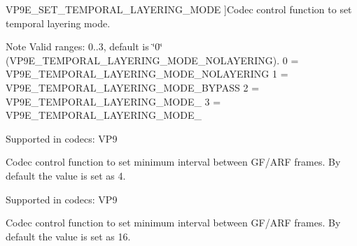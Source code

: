 \begin{Desc}
\begin{description}
{V\+P9\+E\+\_\+\+S\+E\+T\+\_\+\+T\+E\+M\+P\+O\+R\+A\+L\+\_\+\+L\+A\+Y\+E\+R\+I\+N\+G\+\_\+\+M\+O\+DE\hypertarget{group__vp8__encoder_gga6deae3d561c838952552c3d3756322eca34af61e36500e1455aa2fc5bf62183ea}{}\label{group__vp8__encoder_gga6deae3d561c838952552c3d3756322eca34af61e36500e1455aa2fc5bf62183ea}
}]Codec control function to set temporal layering mode. \begin{DoxyNote}{Note}
Valid ranges\+: 0..3, default is \char`\"{}0\char`\"{} (V\+P9\+E\+\_\+\+T\+E\+M\+P\+O\+R\+A\+L\+\_\+\+L\+A\+Y\+E\+R\+I\+N\+G\+\_\+\+M\+O\+D\+E\+\_\+\+N\+O\+L\+A\+Y\+E\+R\+I\+NG). 0 = V\+P9\+E\+\_\+\+T\+E\+M\+P\+O\+R\+A\+L\+\_\+\+L\+A\+Y\+E\+R\+I\+N\+G\+\_\+\+M\+O\+D\+E\+\_\+\+N\+O\+L\+A\+Y\+E\+R\+I\+NG 1 = V\+P9\+E\+\_\+\+T\+E\+M\+P\+O\+R\+A\+L\+\_\+\+L\+A\+Y\+E\+R\+I\+N\+G\+\_\+\+M\+O\+D\+E\+\_\+\+B\+Y\+P\+A\+SS 2 = V\+P9\+E\+\_\+\+T\+E\+M\+P\+O\+R\+A\+L\+\_\+\+L\+A\+Y\+E\+R\+I\+N\+G\+\_\+\+M\+O\+D\+E\+\_ 3 = V\+P9\+E\+\_\+\+T\+E\+M\+P\+O\+R\+A\+L\+\_\+\+L\+A\+Y\+E\+R\+I\+N\+G\+\_\+\+M\+O\+D\+E\+\_
\end{DoxyNote}
Supported in codecs\+: V\+P9 \item[{\em 
V\+P9\+E\+\_\+\+S\+E\+T\+\_\+\+M\+I\+N\+\_\+\+G\+F\+\_\+\+I\+N\+T\+E\+R\+V\+AL\hypertarget{group__vp8__encoder_gga6deae3d561c838952552c3d3756322eca04ae4a1b699c5d22f2510c7509124ea9}{}\label{group__vp8__encoder_gga6deae3d561c838952552c3d3756322eca04ae4a1b699c5d22f2510c7509124ea9}
}]Codec control function to set minimum interval between G\+F/\+A\+RF frames. By default the value is set as 4.

Supported in codecs\+: V\+P9 \item[{\em 
V\+P9\+E\+\_\+\+S\+E\+T\+\_\+\+M\+A\+X\+\_\+\+G\+F\+\_\+\+I\+N\+T\+E\+R\+V\+AL\hypertarget{group__vp8__encoder_gga6deae3d561c838952552c3d3756322ecae8a09d2ee42538af1c00bc403c6d29d8}{}\label{group__vp8__encoder_gga6deae3d561c838952552c3d3756322ecae8a09d2ee42538af1c00bc403c6d29d8}
}]Codec control function to set minimum interval between G\+F/\+A\+RF frames. By default the value is set as 16.


\end{description}
\end{Desc}
